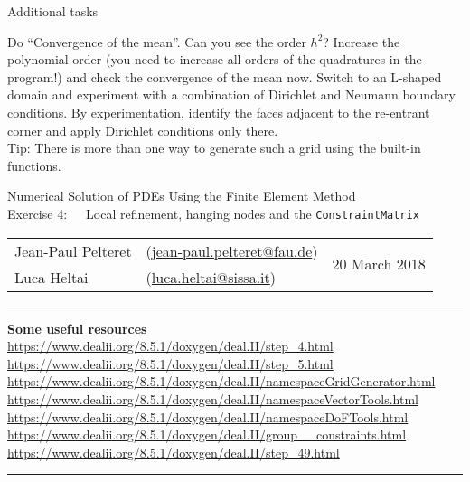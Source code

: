 \documentclass[11pt,answers]{exam}
\makeatletter
\newcommand{\makeheader}[3]{%
\setcounter{question}{0}
\begin{center}
{\sc Numerical Solution of PDEs Using the Finite Element Method}\vspace{2ex}\\
{\sc Exercise #1:\ \ \ #2}\vspace{2ex}\\
\begin{tabular*}{\textwidth}{ll @{\extracolsep{\fill}}r}
Jean-Paul Pelteret & (\url{jean-paul.pelteret@fau.de}) & \multirow{2}{*}{#3} \\
Luca Heltai & (\url{luca.heltai@sissa.it}) & \\
\end{tabular*}
\end{center}
}
\newcommand{\makeresources}[1]{%
\rule{\textwidth}{0.6mm}
\textbf{Some useful resources}\\[1.5ex]
#1 \par
\rule{\textwidth}{0.6mm}
}
\makeatother
\begin{document}
\begin{questions}

\question Additional tasks
\begin{parts}
\bonuspart Do ``Convergence of the mean''. Can you see the order $h^{2}$? 
\bonuspart Increase the polynomial order (you need to increase all orders of the quadratures in the program!) and check the convergence of the mean now.
\bonuspart Switch to an L-shaped domain and experiment with a combination of Dirichlet and Neumann boundary conditions. 
By experimentation, identify the faces adjacent to the re-entrant corner and apply Dirichlet conditions only there. \\
Tip: There is more than one way to generate such a grid using the built-in functions. 
\end{parts}

\end{questions}




\clearpage
\makeheader{4}{Local refinement, hanging nodes and the \texttt{ConstraintMatrix}}{20 March 2018}
\makeresources{%
\url{https://www.dealii.org/8.5.1/doxygen/deal.II/step_4.html} \\
\url{https://www.dealii.org/8.5.1/doxygen/deal.II/step_5.html} \\
\url{https://www.dealii.org/8.5.1/doxygen/deal.II/namespaceGridGenerator.html} \\
\url{https://www.dealii.org/8.5.1/doxygen/deal.II/namespaceVectorTools.html} \\
\url{https://www.dealii.org/8.5.1/doxygen/deal.II/namespaceDoFTools.html} \\
\url{https://www.dealii.org/8.5.1/doxygen/deal.II/group__constraints.html} \\
\url{https://www.dealii.org/8.5.1/doxygen/deal.II/step_49.html}
}
\end{document}
